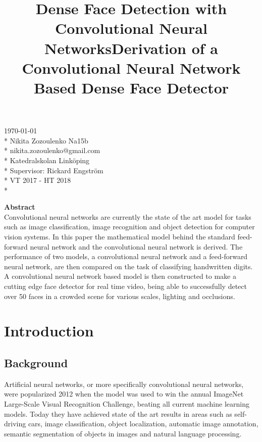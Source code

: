 \documentclass[a4paper,11pt,twoside]{article}
\title{Dense Face Detection with Convolutional Neural Networks}
\title{Derivation of a Convolutional Neural Network Based Dense Face Detector}
\date{}
\begin{document}
\maketitle
\vfill

\begin{flushright}
\today \\*
Nikita Zozoulenko Na15b \\*
nikita.zozoulenko@gmail.com \\*
Katedralskolan Linköping\\*
Supervisor: Rickard Engström \\*
VT 2017 - HT 2018 \\*
\end{flushright}
\newpage

\Large{\textbf{Abstract}}\\

Convolutional neural networks are currently the state of the art model for tasks such as image classification, image recognition and object detection for computer vision systems. In this paper the mathematical model behind the standard feed-forward neural network and the convolutional neural network is derived. The performance of two models, a convolutional neural network and a feed-forward neural network, are then compared on the task of classifying handwritten digits. A convolutional neural network based model is then constructed to make a cutting edge face detector for real time video, being able to successfully detect over 50 faces in a crowded scene for various scales, lighting and occlusions.
\newpage

\tableofcontents

\section{Introduction}

\subsection{Background}
Artificial neural networks, or more specifically convolutional neural networks, were popularized 2012 when the model was used to win the annual ImageNet Large-Scale Visual Recognition Challenge, beating all current machine learning models. Today they have achieved state of the art results in areas such as self-driving cars, image classification, object localization, automatic image annotation, semantic segmentation of objects in images and natural language processing. 
\cite{cs231n}
\end{document}

